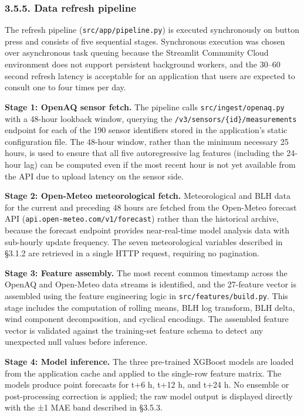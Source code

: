 \subsubsection{3.5.5. Data refresh pipeline}\label{data-refresh-pipeline}

The refresh pipeline (\texttt{src/app/pipeline.py}) is executed synchronously on button press and consists of five sequential stages. Synchronous execution was chosen over asynchronous task queuing because the Streamlit Community Cloud environment does not support persistent background workers, and the 30--60 second refresh latency is acceptable for an application that users are expected to consult one to four times per day.

\textbf{Stage 1: OpenAQ sensor fetch.} The pipeline calls \texttt{src/ingest/openaq.py} with a 48-hour lookback window, querying the \texttt{/v3/sensors/\{id\}/measurements} endpoint for each of the 190 sensor identifiers stored in the application's static configuration file. The 48-hour window, rather than the minimum necessary 25 hours, is used to ensure that all five autoregressive lag features (including the 24-hour lag) can be computed even if the most recent hour is not yet available from the API due to upload latency on the sensor side.

\textbf{Stage 2: Open-Meteo meteorological fetch.} Meteorological and BLH data for the current and preceding 48 hours are fetched from the Open-Meteo forecast API (\texttt{api.open-meteo.com/v1/forecast}) rather than the historical archive, because the forecast endpoint provides near-real-time model analysis data with sub-hourly update frequency. The seven meteorological variables described in §3.1.2 are retrieved in a single HTTP request, requiring no pagination.

\textbf{Stage 3: Feature assembly.} The most recent common timestamp across the OpenAQ and Open-Meteo data streams is identified, and the 27-feature vector is assembled using the feature engineering logic in \texttt{src/features/build.py}. This stage includes the computation of rolling means, BLH log transform, BLH delta, wind component decomposition, and cyclical encodings. The assembled feature vector is validated against the training-set feature schema to detect any unexpected null values before inference.

\textbf{Stage 4: Model inference.} The three pre-trained XGBoost models are loaded from the application cache and applied to the single-row feature matrix. The models produce point forecasts for t+6 h, t+12 h, and t+24 h. No ensemble or post-processing correction is applied; the raw model output is displayed directly with the ±1 MAE band described in §3.5.3.

